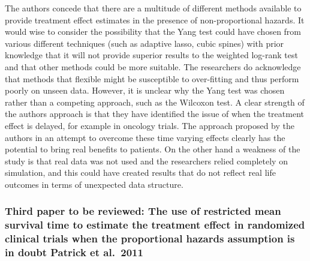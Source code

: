 \documentclass[12pt,twoside]{reedthesis}
\begin{document}
The authors concede that there are a multitude of different methods available to provide treatment effect estimates in the presence of non-proportional hazards. It would wise to consider the possibility that the Yang test could have chosen from various different techniques (such as adaptive lasso, cubic spines) with prior knowledge that it will not provide superior results to the weighted log-rank test and that other methods could be more suitable. The researchers do acknowledge that methods that flexible might be susceptible to over-fitting and thus perform poorly on unseen data. However, it is unclear why the Yang test was chosen rather than a competing approach, such as the Wilcoxon test.
A clear strength of the authors approach is that they have identified the issue of when the treatment effect is delayed, for example in oncology trials. The approach proposed by the authors in an attempt to overcome these time varying effects clearly has the potential to bring real benefits to patients. On the other hand a weakness of the study is that real data was not used and the researchers relied completely on simulation, and this could have created results that do not reflect real life outcomes in terms of unexpected data structure.

\hypertarget{third-paper-to-be-reviewed-the-use-of-restricted-mean-survival-time-to-estimate-the-treatment-effect-in-randomized-clinical-trials-when-the-proportional-hazards-assumption-is-in-doubt-patrick-et-al.-2011}{%
\subsubsection{Third paper to be reviewed: The use of restricted mean survival time to estimate the treatment effect in randomized clinical trials when the proportional hazards assumption is in doubt Patrick et al.~2011}\label{third-paper-to-be-reviewed-the-use-of-restricted-mean-survival-time-to-estimate-the-treatment-effect-in-randomized-clinical-trials-when-the-proportional-hazards-assumption-is-in-doubt-patrick-et-al.-2011}}
\end{document}

